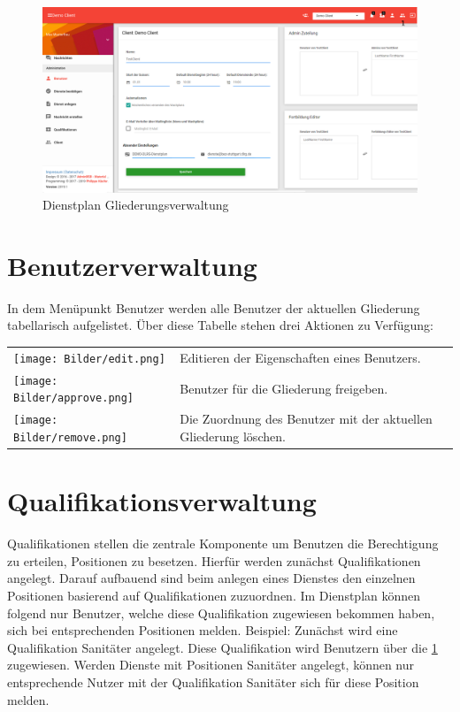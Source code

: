 \begin{figure}[h]
	\begin{addmargin}{-0.2\linewidth}
		\centering 
		\includegraphics[width=20cm]{Bilder/view_admin.png}
	\end{addmargin} 
	\caption[Gliederungsverwaltung]{Dienstplan Gliederungsverwaltung}
	\label{fig:view_client}
\end{figure}

\section{Benutzerverwaltung}
\label{sec:admin_benutzerverwaltung}
In dem Menüpunkt Benutzer werden alle Benutzer der aktuellen Gliederung tabellarisch aufgelistet. Über diese Tabelle stehen drei Aktionen zu Verfügung:

\begin{table}[H]
	\centering
	\begin{tabular}{ll}
		\texttt{[image: Bilder/edit.png]} & Editieren der Eigenschaften eines Benutzers. \\[10pt]
		\texttt{[image: Bilder/approve.png]}	& Benutzer für die Gliederung freigeben. \\[10pt]
		\texttt{[image: Bilder/remove.png]} & Die Zuordnung des Benutzer mit der aktuellen Gliederung löschen. \\
	\end{tabular}
\end{table}

\section{Qualifikationsverwaltung}
\label{sec:admin_qualifikationsverwaltung}
Qualifikationen stellen die zentrale Komponente um Benutzen die Berechtigung zu erteilen, Positionen zu besetzen. Hierfür werden zunächst Qualifikationen angelegt. Darauf aufbauend sind beim anlegen eines Dienstes den einzelnen Positionen basierend auf Qualifikationen zuzuordnen. Im Dienstplan können folgend nur Benutzer, welche diese Qualifikation zugewiesen bekommen haben, sich bei entsprechenden Positionen melden. Beispiel: Zunächst wird eine Qualifikation Sanitäter angelegt. Diese Qualifikation wird Benutzern über die \ref{sec:admin_benutzerverwaltung}  zugewiesen. Werden Dienste mit Positionen \glqq Sanitäter\grqq{} angelegt, können nur entsprechende Nutzer mit der Qualifikation \glqq Sanitäter\grqq{} sich für diese Position melden.

